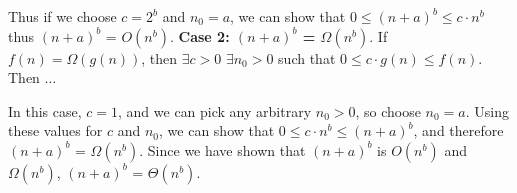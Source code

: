 \documentclass[11pt]{article}
\begin{document}
\begin{flushleft}
		\begin{center}
		\end{center}

		Thus if we choose $c = 2^b$ and $n_0 = a$, we can show that $0 \leq (n+a)^b \leq c \cdot n^b$ \newline thus $(n+a)^b$ = $O(n^b)$.
		\newline\newline
		\textbf{Case 2: $(n+a)^b$ = $\Omega(n^b)$}. \newline
		If $f(n) = \Omega(g(n))$, then $\exists c > 0$ $\exists n_0 > 0$ such that 
		$0 \leq c \cdot g(n) \leq f(n)$. Then $\dots$
		\begin{center}
		\end{center}
		In this case, $c = 1$, and we can pick any arbitrary $n_0 > 0$, so choose $n_0 = a$. Using these values for $c$ and $n_0$, we can show that $0 \leq c \cdot n^b \leq (n + a)^b$, and therefore $(n+a)^b$ = $\Omega(n^b)$. Since we have shown that $(n+a)^b$ is $O(n^b)$ and  $\Omega(n^b)$, $(n+a)^b$ = $\Theta(n^b)$.
		
	\end{flushleft}
\end{document}
